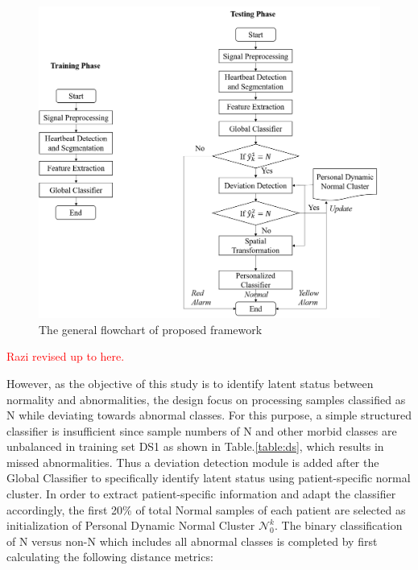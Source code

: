 \begin{figure}[ht]
	\centering
	\includegraphics[scale=.5]{Fig/flow2.png}
	\caption{The general flowchart of proposed framework}
	\label{fig:flow}
\end{figure}

\textcolor{red}{Razi revised up to here.}

However, as the objective of this study is to identify latent status between normality and abnormalities, the design focus on processing samples classified as N while deviating towards abnormal classes. For this purpose, a simple structured classifier is insufficient since sample numbers of N and other morbid classes are unbalanced in training set DS1 as shown in Table.\ref{table:ds}, which results in missed abnormalities. Thus a deviation detection module is added after the Global Classifier to specifically identify latent status using patient-specific normal cluster. In order to extract patient-specific information and adapt the classifier accordingly, the first 20\% of total Normal samples of each patient are selected as initialization of Personal Dynamic Normal Cluster $\mathcal{N}_0^k$. The binary classification of N versus non-N which includes all abnormal classes is completed by first calculating the following distance metrics:

